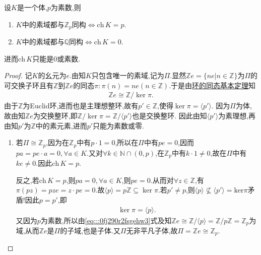 \documentclass[../../main.tex]{subfiles}%
\begin{document}
\begin{theorem}\label{theorem:抽象代数--定理3.1.2}
设$K$是一个体,$p$为素数,则
\begin{enumerate}[(1)]
\item $K\text{中的素域都与}\mathbb{Z} _p\text{同构}\Longleftrightarrow \mathrm{ch}\,K=p$.

\item $K\text{中的素域都与}\mathbb{Q} \text{同构}\Longleftrightarrow \mathrm{ch}\,K=0$.
\end{enumerate}
进而$\mathrm{ch}\,K$只能是$0$或素数.
\end{theorem}
\begin{proof}
记$K$的幺元为$e$.由知$K$只包含唯一的素域,记为$\Pi$.显然$\mathbb{Z}e=\{ne|n\in\mathbb{Z}\}$为$\Pi$的可交换子环且有$\mathbb{Z}$到$\mathbb{Z}e$的同态$\pi:\pi(n)=ne(n\in\mathbb{Z})$.于是由\hyperref[theorem:环的同态基本定理]{环的同态基本定理}知
\begin{align}\label{eq:::0fj290r2fsgehw3}
\mathbb{Z}e\cong \mathbb{Z}/\ker\pi.
\end{align}
由于$\mathbb{Z}$为Euclid环,进而也是主理想整环,故有$p'\in \mathbb{Z}$,使得$\ker\pi=\langle p'\rangle $.
因为$\Pi$为体,故由知$\mathbb{Z}e$为交换整环,即$\mathbb{Z}/\ker\pi=\mathbb{Z}/\langle p'\rangle$也是交换整环.
因此由知$\langle p'\rangle$为素理想,再由知$p'$为$\mathbb{Z}$中的素元素,进而$p'$只能为素数或零.
\begin{enumerate}[(1)]
\item 若$\Pi\cong\mathbb{Z}_p$,因为在$\mathbb{Z}_p$中有$p\cdot 1=0$,所以在$\Pi$中有$pe=0$,因而$pa=pe\cdot a=0,\forall a\in K$.又对$\forall k\in \mathbb{N}\cap (0,p)$,在$\mathbb{Z}_p$中有$k\cdot 1\neq 0$,故在$\Pi$中有$ke\neq 0$.因此$\text{ch}\,K=p.$

反之,若$\text{ch}\,K=p$,则$pa=0,\forall a\in K$,则$pe=0$.从而对$\forall z\in \mathbb{Z}$,有$\pi \left( pz \right) =pze=z\cdot pe =0$.故$\langle p\rangle=p\mathbb{Z}\subseteq \ker \pi.$若$p'\neq p$,则$\langle p\rangle \nsubseteq \langle p' \rangle =\mathrm{ker}\pi $矛盾!因此$p=p'$,即
\begin{align*}
\ker \pi =\langle p\rangle.
\end{align*}
又因为$p$为素数,所以由\eqref{eq:::0fj290r2fsgehw3}式及知$\mathbb{Z}e\cong \mathbb{Z}/\langle p\rangle=\mathbb{Z}/p\mathbb{Z} = \mathbb{Z}_p$为域,从而$\mathbb{Z}e$是$\Pi$的子域,也是子体.又$\Pi$无非平凡子体,故$\Pi=\mathbb{Z}e\cong\mathbb{Z}_p$.


\end{enumerate}
\end{proof}
\end{document}

